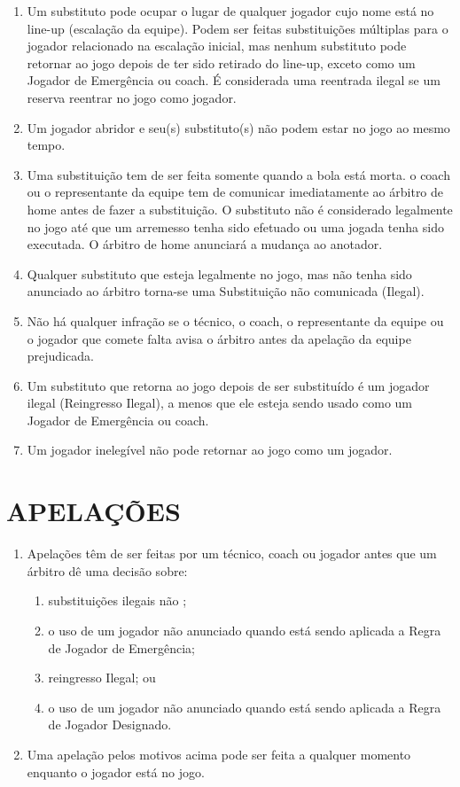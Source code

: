 \begin{enumerate}[label=(\alph*)]
	\item Um substituto pode ocupar o lugar de qualquer jogador cujo nome está no \gls{line-up} (escalação da equipe). Podem ser feitas substituições múltiplas para o jogador relacionado na escalação inicial, mas nenhum substituto pode retornar ao jogo depois de ter sido retirado do \gls{line-up}, exceto como um Jogador de Emergência ou \gls{coach}. É considerada uma reentrada ilegal se um reserva  reentrar no jogo como jogador.
 	\item Um jogador abridor e seu(s) substituto(s) não podem estar no jogo ao mesmo tempo.
	\item Uma substituição tem de ser feita somente quando a bola está morta. o \gls{coach} ou o representante da equipe tem de comunicar imediatamente ao árbitro de \gls{home} antes de fazer a substituição. O substituto não é considerado legalmente no jogo até que um arremesso tenha sido efetuado ou uma jogada  tenha sido executada. O árbitro de \gls{home} anunciará a mudança ao anotador.
	\item Qualquer substituto que esteja legalmente no jogo, mas não tenha sido anunciado ao árbitro torna-se uma Substituição não comunicada (Ilegal).
	\item Não há qualquer infração se o técnico, o \gls{coach}, o representante da equipe ou o jogador que comete falta avisa o árbitro antes da apelação da equipe prejudicada.
	\item Um substituto que retorna ao jogo depois de ser substituído é um jogador ilegal (Reingresso Ilegal), a menos que ele esteja sendo usado como um Jogador de Emergência ou \gls{coach}.
	\item Um jogador inelegível não pode retornar ao jogo como um jogador.
\end{enumerate}

\section{APELAÇÕES}
\begin{enumerate}[label=(\alph*)]
	\item Apelações têm de ser feitas por um técnico, \gls{coach} ou jogador antes que um árbitro dê uma decisão sobre:
	 \begin{enumerate}[label=\roman*.]
	 	\item substituições ilegais não ;
	 	\item o uso de um jogador não anunciado quando está sendo aplicada a Regra de Jogador de Emergência;
		\item reingresso Ilegal; ou
		\item o uso de um jogador não anunciado quando está sendo aplicada a Regra de Jogador Designado.
	\end{enumerate}
\item  Uma apelação pelos motivos acima pode ser feita a qualquer momento enquanto o jogador está no jogo.
\end{enumerate}

